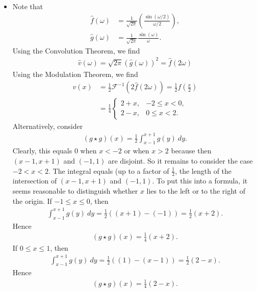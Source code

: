 \documentclass[11pt]{article}
\begin{document}
\begin{solution}
\begin{itemize}
        
        \item 
        Note that
        \begin{align*}
            \hat{f}(\omega) &= \frac{1}{\sqrt{2 \pi}} \left(\frac{\sin(\omega / 2)}{\omega / 2}\right),
            \\
            \hat{g}(\omega) &= \frac{1}{\sqrt{2 \pi}} \frac{\sin(\omega)}{\omega}.
        \end{align*}
        Using the Convolution Theorem, we find
        \begin{align*}
            \hat{v}(\omega) = \sqrt{2 \pi}(\hat g (\omega))^2 = \hat f(2 \omega)
        \end{align*}
        Using the Modulation Theorem, we find
        \begin{align*}
            v(x) &= \frac 1 2 \mathcal{F}^{-1}(2 \hat f(2 \omega)) = \frac 1 2 f(\frac x 2)\\
                &= \frac 1 4 \begin{cases}
                    2 + x,& -2 \leq x < 0,\\
                    2 - x,& 0 \leq x < 2.
                \end{cases}
        \end{align*}
        Alternatively, consider 
        \begin{align*}
            ( g \star g )(x) = \frac 1 2 \int_{x-1}^{x+1} g(y) \ dy.
        \end{align*}
        Clearly, this equals $0$ when $x < -2$ or when $x > 2$ because then $(x-1,x+1)$ and $(-1,1)$ are disjoint. 
        So it remains to consider the case $-2 < x < 2$.
        The integral equals (up to a factor of $\tfrac 1 2$, the length of the intersection of $(x-1,x+1)$ and $(-1,1)$. 
        To put this into a formula, it seems reasonable to distinguish whether $x$ lies to the left or to the right of the origin.
        If $-1 \leq x \leq 0$, then 
        \begin{align*}
            \int_{x-1}^{x+1} g(y) \ dy = \frac 1 2 ( (x+1) - (-1) ) = \frac 1 2 ( x + 2 ).
        \end{align*}
        Hence 
        \begin{align*}
            ( g \star g )(x) = \frac 1 4 ( x + 2 ).
        \end{align*}
        If $0 \leq x \leq 1$, then 
        \begin{align*}
            \int_{x-1}^{x+1} g(y) \ dy = \frac 1 2 ( (1) - (x-1) ) = \frac 1 2 ( 2 - x ).
        \end{align*}
        Hence 
        \begin{align*}
            ( g \star g )(x) = \frac 1 4 ( 2 - x ).
        \end{align*}
        

\end{itemize}
\end{solution}
\end{document}
